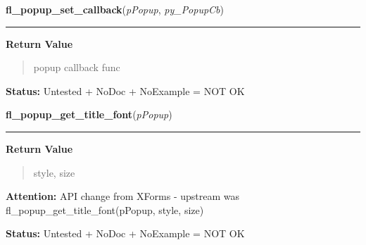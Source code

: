 \hspace{.8\funcindent}\begin{boxedminipage}{\funcwidth}

    \raggedright \textbf{fl\_popup\_set\_callback}(\textit{pPopup}, \textit{py\_PopupCb})

    \vspace{-1.5ex}

    \rule{\textwidth}{0.5\fboxrule}
\setlength{\parskip}{2ex}
\setlength{\parskip}{1ex}
      \textbf{Return Value}
    \vspace{-1ex}

      \begin{quote}
      popup callback func

      \end{quote}

\textbf{Status:} Untested + NoDoc + NoExample = NOT OK



    \end{boxedminipage}

    \label{xformslib:library:fl_popup_get_title_font}

    \vspace{0.5ex}

\hspace{.8\funcindent}\begin{boxedminipage}{\funcwidth}

    \raggedright \textbf{fl\_popup\_get\_title\_font}(\textit{pPopup})

    \vspace{-1.5ex}

    \rule{\textwidth}{0.5\fboxrule}
\setlength{\parskip}{2ex}
\setlength{\parskip}{1ex}
      \textbf{Return Value}
    \vspace{-1ex}

      \begin{quote}
      style, size

      \end{quote}

\textbf{Attention:} API change from XForms - upstream was fl\_popup\_get\_title\_font(pPopup, 
style, size)



\textbf{Status:} Untested + NoDoc + NoExample = NOT OK



    \end{boxedminipage}


